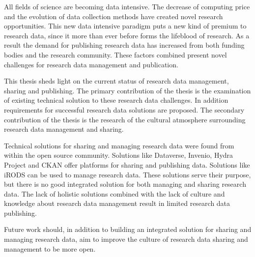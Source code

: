 All fields of science are becoming data intensive. The decrease of computing
price and the evolution of data collection methods have created novel research
opportunities. This new data intensive paradigm
puts a new kind of premium to research data, since it more than ever before
forms the lifeblood of research. As a result the demand for publishing
research data has increased from both funding bodies and the research
community. These factors combined present novel challenges for research data
management and publication.

This thesis sheds light on the current status of research data management,
sharing and publishing. The primary contribution of the thesis is the
examination of existing technical solution to these research data challenges.
In addition requirements for successful research data solutions are proposed.
The secondary contribution of the thesis is the research of the cultural
atmosphere surrounding research data management and sharing.

Technical solutions for sharing and managing research data were found from
within the open source community. Solutions like Dataverse, Invenio, Hydra
Project and CKAN offer platforms for sharing and publishing data. Solutions
like iRODS can be used to manage research data. These solutions serve
their purpose, but there is no good integrated solution for both managing and
sharing research data. The lack of holistic solutions combined with the lack of
culture and knowledge about research data management result in limited research
data publishing.

Future work should, in addition to
building an integrated solution for sharing and managing research data, aim to
improve the culture of research data sharing and management to be more open.



